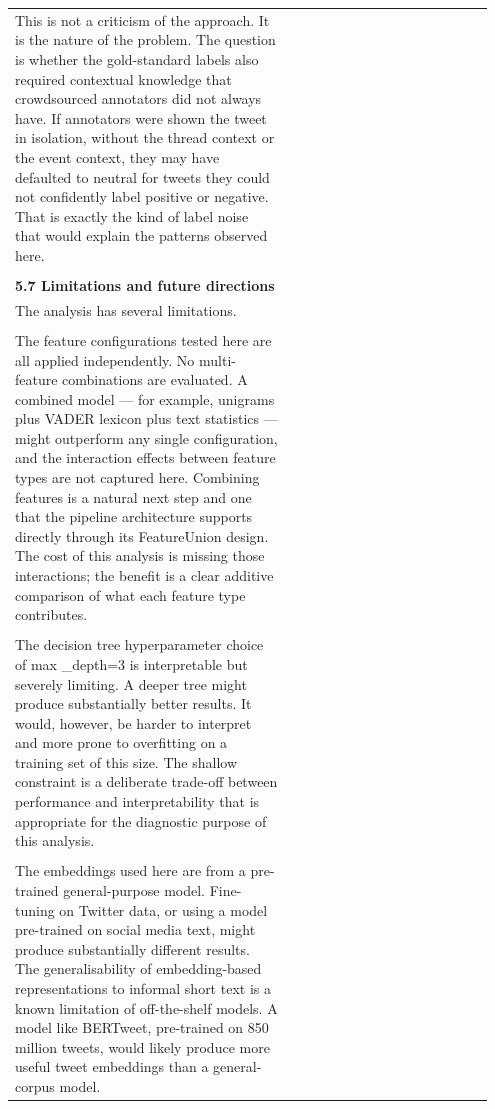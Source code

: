 \documentclass[11pt]{article}
\begin{document}
\begin{longtable}{|p{0.55\linewidth}|p{0.40\linewidth}|}
\hline
\rule{0pt}{3.5cm} & \\
\hline
This is not a criticism of the approach. It is the nature of the problem. The question is whether the gold-standard labels also required contextual knowledge that crowdsourced annotators did not always have. If annotators were shown the tweet in isolation, without the thread context or the event context, they may have defaulted to neutral for tweets they could not confidently label positive or negative. That is exactly the kind of label noise that would explain the patterns observed here. & \\[2pt]
\hline
\rule{0pt}{3.5cm} & \\
\hline
\multicolumn{2}{|l|}{\textbf{5.7 Limitations and future directions}} \\[2pt]
\hline
The analysis has several limitations. & \\[2pt]
\hline
\rule{0pt}{3.5cm} & \\
\hline
The feature configurations tested here are all applied independently. No multi-feature combinations are evaluated. A combined model --- for example, unigrams plus VADER lexicon plus text statistics --- might outperform any single configuration, and the interaction effects between feature types are not captured here. Combining features is a natural next step and one that the pipeline architecture supports directly through its FeatureUnion design. The cost of this analysis is missing those interactions; the benefit is a clear additive comparison of what each feature type contributes. & \\[2pt]
\hline
\rule{0pt}{3.5cm} & \\
\hline
The decision tree hyperparameter choice of max \_depth=3 is interpretable but severely limiting. A deeper tree might produce substantially better results. It would, however, be harder to interpret and more prone to overfitting on a training set of this size. The shallow constraint is a deliberate trade-off between performance and interpretability that is appropriate for the diagnostic purpose of this analysis. & \\[2pt]
\hline
\rule{0pt}{3.5cm} & \\
\hline
The embeddings used here are from a pre-trained general-purpose model. Fine-tuning on Twitter data, or using a model pre-trained on social media text, might produce substantially different results. The generalisability of embedding-based representations to informal short text is a known limitation of off-the-shelf models. A model like BERTweet, pre-trained on 850 million tweets, would likely produce more useful tweet embeddings than a general-corpus model. & \\[2pt]

\end{longtable}
\end{document}
